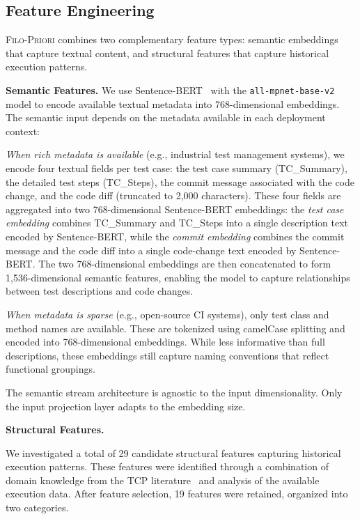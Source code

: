 \documentclass[10pt,journal,compsoc]{IEEEtran}
\newcommand{\filopriori}{\textsc{Filo-Priori}}
\begin{document}
\subsection{Feature Engineering}
\label{sec:feature_engineering}

\filopriori{} combines two complementary feature types: semantic embeddings
that capture textual content, and structural features that capture historical
execution patterns.

\textbf{Semantic Features.}
We use Sentence-BERT~\cite{reimers2019sentence} with the
\texttt{all-mpnet-base-v2} model to encode available textual metadata into
768-dimensional embeddings. The semantic input depends on the metadata
available in each deployment context:

\emph{When rich metadata is available} (e.g., industrial test management
systems), we encode four textual fields per test case: the test case summary
(TC\_Summary), the detailed test steps (TC\_Steps), the commit message
associated with the code change, and the code diff (truncated to 2,000
characters). These four fields are aggregated into two
768-dimensional Sentence-BERT embeddings: the \emph{test case embedding}
combines TC\_Summary and TC\_Steps into a single description text encoded
by Sentence-BERT, while the \emph{commit embedding} combines the commit
message and the code diff into a single code-change text encoded by
Sentence-BERT. The two 768-dimensional embeddings are then concatenated
to form 1,536-dimensional semantic features, enabling the model to capture
relationships between test descriptions and code changes.

\emph{When metadata is sparse} (e.g., open-source CI systems), only test
class and method names are available. These are tokenized using camelCase
splitting and encoded into 768-dimensional embeddings. While less informative
than full descriptions, these embeddings still capture naming conventions that
reflect functional groupings.

The semantic stream architecture is agnostic to the input dimensionality.
Only the input projection layer adapts to the embedding size.

\textbf{Structural Features.}

We investigated a total of 29 candidate structural features capturing historical
execution patterns. These features were identified through a combination of
domain knowledge from the TCP literature~\cite{chen2023deeporder, kim2002history}
and analysis of the available execution data. After feature selection,
19 features were retained, organized into two categories.
\end{document}
